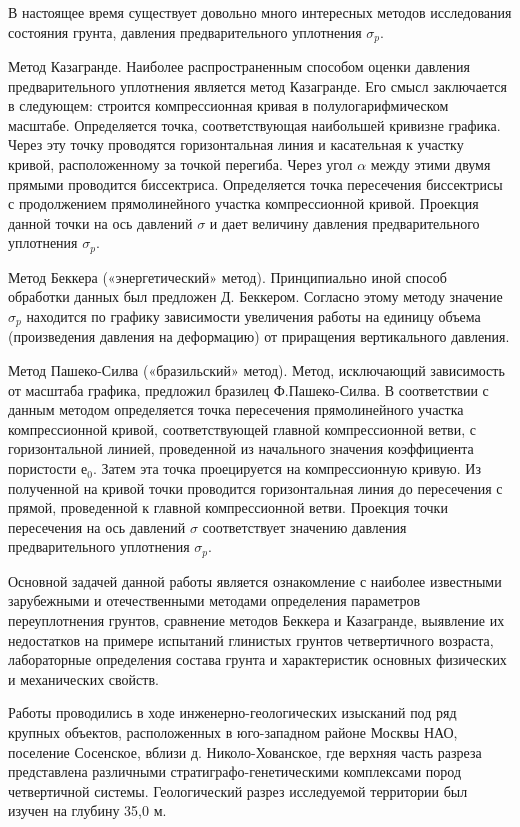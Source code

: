В настоящее время существует довольно много интересных методов исследования  состояния грунта, давления предварительного уплотнения $\sigma_p$. 

Метод Казагранде.
	Наиболее распространенным способом оценки давления предварительного уплотнения является метод Казагранде. Его смысл заключается в следующем: строится компрессионная кривая в полулогарифмическом масштабе. Определяется точка, соответствующая наибольшей кривизне графика. Через эту точку проводятся горизонтальная линия и касательная к участку кривой, расположенному за точкой перегиба. Через угол $\alpha$ между этими двумя прямыми проводится биссектриса. Определяется точка пересечения биссектрисы с продолжением прямолинейного участка компрессионной кривой. Проекция данной точки на ось давлений $\sigma$ и дает величину давления предварительного уплотнения $\sigma_p$.

Метод Беккера («энергетический» метод).
	Принципиально иной способ обработки данных был предложен Д. Беккером. Согласно этому методу значение $\sigma_p$ находится по графику зависимости увеличения работы на единицу объема (произведения давления на деформацию) от приращения вертикального давления.

Метод Пашеко-Силва («бразильский» метод).
    Метод, исключающий зависимость от масштаба графика, предложил бразилец Ф.Пашеко-Силва. 
    В соответствии с данным методом определяется точка пересечения прямолинейного участка компрессионной кривой, соответствующей главной компрессионной ветви, с горизонтальной линией, проведенной из начального значения коэффициента пористости $е_0$. 
    Затем эта точка проецируется на компрессионную кривую. 
    Из полученной на кривой точки проводится горизонтальная линия до пересечения с прямой, проведенной к главной компрессионной ветви. 
    Проекция точки пересечения на ось давлений $\sigma$ соответствует значению давления предварительного уплотнения $\sigma_p$.

	


 Основной задачей данной работы является ознакомление с наиболее известными зарубежными и отечественными методами определения параметров переуплотнения грунтов, сравнение методов Беккера и Казагранде, выявление их недостатков на примере испытаний глинистых грунтов четвертичного возраста, лабораторные определения состава грунта и характеристик основных физических и механических свойств. 
 
Работы проводились в ходе инженерно-геологических изысканий под ряд крупных объектов, расположенных в юго-западном районе Москвы НАО, поселение Сосенское, вблизи д. Николо-Хованское, где верхняя часть разреза представлена различными стратиграфо-генетическими комплексами пород четвертичной системы. Геологический разрез исследуемой территории был изучен на глубину 35,0 м.

